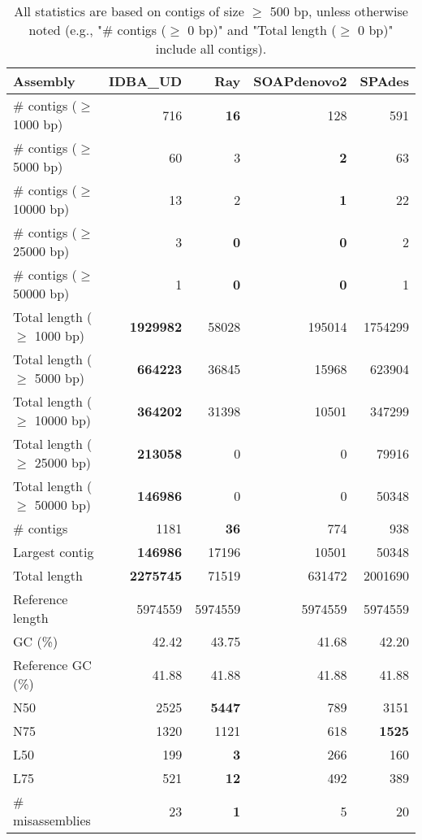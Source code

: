 \documentclass[12pt,a4paper]{article}
\begin{document}
\begin{table}[ht]
\begin{center}
\caption{All statistics are based on contigs of size $\geq$ 500 bp, unless otherwise noted (e.g., "\# contigs ($\geq$ 0 bp)" and "Total length ($\geq$ 0 bp)" include all contigs).}
\begin{tabular}{|l*{4}{|r}|}
\hline
Assembly & IDBA\_UD & Ray & SOAPdenovo2 & SPAdes \\ \hline
\# contigs ($\geq$ 1000 bp) & 716 & {\bf 16} & 128 & 591 \\ \hline
\# contigs ($\geq$ 5000 bp) & 60 & 3 & {\bf 2} & 63 \\ \hline
\# contigs ($\geq$ 10000 bp) & 13 & 2 & {\bf 1} & 22 \\ \hline
\# contigs ($\geq$ 25000 bp) & 3 & {\bf 0} & {\bf 0} & 2 \\ \hline
\# contigs ($\geq$ 50000 bp) & 1 & {\bf 0} & {\bf 0} & 1 \\ \hline
Total length ($\geq$ 1000 bp) & {\bf 1929982} & 58028 & 195014 & 1754299 \\ \hline
Total length ($\geq$ 5000 bp) & {\bf 664223} & 36845 & 15968 & 623904 \\ \hline
Total length ($\geq$ 10000 bp) & {\bf 364202} & 31398 & 10501 & 347299 \\ \hline
Total length ($\geq$ 25000 bp) & {\bf 213058} & 0 & 0 & 79916 \\ \hline
Total length ($\geq$ 50000 bp) & {\bf 146986} & 0 & 0 & 50348 \\ \hline
\# contigs & 1181 & {\bf 36} & 774 & 938 \\ \hline
Largest contig & {\bf 146986} & 17196 & 10501 & 50348 \\ \hline
Total length & {\bf 2275745} & 71519 & 631472 & 2001690 \\ \hline
Reference length & 5974559 & 5974559 & 5974559 & 5974559 \\ \hline
GC (\%) & 42.42 & 43.75 & 41.68 & 42.20 \\ \hline
Reference GC (\%) & 41.88 & 41.88 & 41.88 & 41.88 \\ \hline
N50 & 2525 & {\bf 5447} & 789 & 3151 \\ \hline
N75 & 1320 & 1121 & 618 & {\bf 1525} \\ \hline
L50 & 199 & {\bf 3} & 266 & 160 \\ \hline
L75 & 521 & {\bf 12} & 492 & 389 \\ \hline
\# misassemblies & 23 & {\bf 1} & 5 & 20 \\ \hline

\end{tabular}
\end{center}
\end{table}
\end{document}
